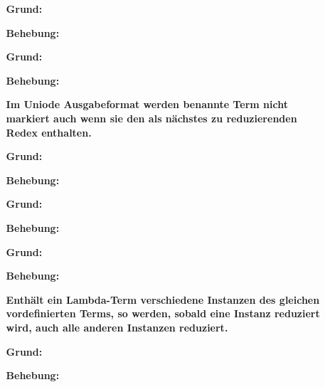 \documentclass[parskip=full,11pt]{scrartcl}
\begin{document}
\begin{itemize}[itemsep=3ex]
\item[] %
\begin{itemize}[noitemsep]
\item[] {\bfseries }
\item [\textbf{Grund:}]
\item [\textbf{Behebung:}]
\end{itemize}

\item[] %
\begin{itemize}[noitemsep]
\item[] {\bfseries  }
\item [\textbf{Grund:}]
\item [\textbf{Behebung:}]
\end{itemize}

\item[] %
\begin{itemize}[noitemsep]
\item[] {\bfseries Im Uniode Ausgabeformat werden benannte Term nicht markiert auch wenn sie den als nächstes zu reduzierenden Redex enthalten. }
\item [\textbf{Grund:}]
\item [\textbf{Behebung:}]
\end{itemize}

\item[] %
\begin{itemize}[noitemsep]
\item[] {\bfseries  }
\item [\textbf{Grund:}]
\item [\textbf{Behebung:}]
\end{itemize}

\item[] %
\begin{itemize}[noitemsep]
\item[] {\bfseries  }
\item [\textbf{Grund:}]
\item [\textbf{Behebung:}]
\end{itemize}

\item[] %
\begin{itemize}[noitemsep]
\item[] {\bfseries Enthält ein Lambda-Term  verschiedene Instanzen des gleichen vordefinierten Terms, so werden, sobald eine Instanz reduziert wird, auch alle anderen Instanzen reduziert. }
\item [\textbf{Grund:}]
\item [\textbf{Behebung:}]
\end{itemize}

\end{itemize}
\end{document}
